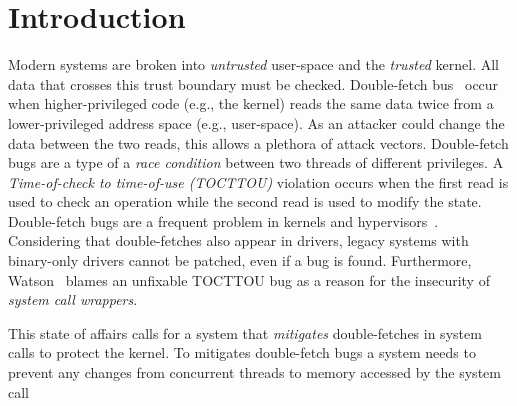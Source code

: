 \documentclass[conference]{IEEEtran}
\newcommand{\mat}[1]{\textcolor{red}{\textbf{Mat:} #1}}
\newcommand{\sysname}{TikTok}
\begin{document}
\section{Introduction}

Modern systems are broken into \emph{untrusted} user-space and the
\emph{trusted} kernel.  All data that crosses this trust boundary must be
checked.  Double-fetch bus~\cite{serna08doublefetch, twizsgrakky07ring0,
wilhelm2016xenpwn, wang2018survey} occur when higher-privileged code (e.g., the
kernel) reads the same data twice from a lower-privileged address space (e.g.,
user-space). As an attacker could change the data between the two reads, this
allows a plethora of attack vectors.  Double-fetch bugs are a type of a
\emph{race condition} between two threads of different privileges. A
\emph{Time-of-check to time-of-use (TOCTTOU)} violation occurs when the first
read is used to check an operation while the second read is used to modify the
state.  Double-fetch bugs are a frequent problem in kernels and
hypervisors~\cite{cve201812633, cve202012652, cve20131332, cve201920610,
cve20158550, cve201610439, cve201610435, cve201610433, cve20195519,
cve20168438}. Considering that double-fetches also appear in drivers, legacy
systems with binary-only drivers cannot be patched, even if a bug is found.
Furthermore, Watson~\cite{watson2007exploiting} blames an unfixable TOCTTOU bug
as a reason for the insecurity of \emph{system call wrappers}.  

This state of affairs calls for a system that \emph{mitigates} double-fetches in
system calls to protect the kernel.
%
To mitigates double-fetch bugs a system needs to
prevent any changes from concurrent threads to memory accessed by the system call



\end{document}
